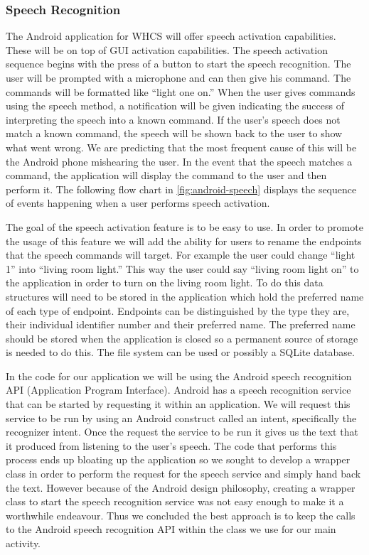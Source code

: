 \subsubsection{Speech Recognition} The Android application for WHCS will offer
speech activation capabilities. These will be on top of GUI activation
capabilities. The speech activation sequence begins with the press of a button
to start the speech recognition. The user will be prompted with a microphone
and can then give his command. The commands will be formatted like {}``light
one on.'' When the user gives commands using the speech method, a notification
will be given indicating the success of interpreting the speech into a known
command. If the user{}'s speech does not match a known command, the speech will
be shown back to the user to show what went wrong. We are predicting that the
most frequent cause of this will be the Android phone mishearing the user. In
the event that the speech matches a command, the application will display the
command to the user and then perform it. The following flow chart in
\autoref{fig:android-speech} displays the sequence of events happening when a
user performs speech activation.


The goal of the speech activation feature is to be easy to use. In order to
promote the usage of this feature we will add the ability for users to rename
the endpoints that the speech commands will target. For example the user could
change {}``light 1'' into {}``living room light.'' This way the user could say
{}``living room light on{}'' to the application in order to turn on the living
room light. To do this data structures will need to be stored in the
application which hold the preferred name of each type of endpoint. Endpoints
can be distinguished by the type they are, their individual identifier number
and their preferred name. The preferred name should be stored when the
application is closed so a permanent source of storage is needed to do this.
The file system can be used or possibly a SQLite database.

In the code for our application we will be using the Android speech recognition
API (Application Program Interface).  Android has a speech recognition service
that can be started by requesting it within an application. We will request
this service to be run by using an Android construct called an intent,
specifically the recognizer intent. Once the request the service to be run it
gives us the text that it produced from listening to the user{}'s speech. The
code that performs this process ends up bloating up the application so we
sought to develop a wrapper class in order to perform the request for the
speech service and simply hand back the text. However because of the Android
design philosophy, creating a wrapper class to start the speech recognition
service was not easy enough to make it a worthwhile endeavour. Thus we
concluded the best approach is to keep the calls to the Android speech
recognition API within the class we use for our main activity.

